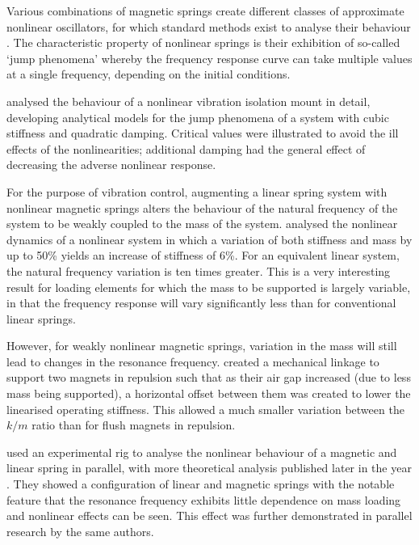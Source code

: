 Various combinations of magnetic springs create different classes of approximate nonlinear oscillators, for which standard methods exist to analyse their behaviour .
The characteristic property of nonlinear springs is their exhibition of so-called `jump phenomena' whereby the frequency response curve can take multiple values at a single frequency, depending on the initial conditions.

\textcite{jazar2006} analysed the behaviour of a nonlinear vibration isolation mount in detail, developing analytical models for the jump phenomena of a system with cubic stiffness and quadratic damping.
Critical values were illustrated to avoid the ill effects of the nonlinearities; additional damping had the general effect of decreasing the adverse nonlinear response.

For the purpose of vibration control, augmenting a linear spring system with nonlinear magnetic springs alters the behaviour of the natural frequency of the system to be weakly coupled to the mass of the system.
\textcite{dangola2006} analysed the nonlinear dynamics of a nonlinear system in which a variation of both stiffness and mass by up to 50\% yields an increase of stiffness of 6\%.
For an equivalent linear system, the natural frequency variation is ten times greater.
This is a very interesting result for loading elements for which the mass to be supported is largely variable, in that the frequency response will vary significantly less than for conventional linear springs.

However, for weakly nonlinear magnetic springs, variation in the mass will still lead to changes in the resonance frequency.
\textcite{todaka2001} created a mechanical linkage to support two magnets in repulsion such that as their air gap increased (due to less mass being supported), a horizontal offset between them was created to lower the linearised operating stiffness.
This allowed a much smaller variation between the $k/m$ ratio than for flush magnets in repulsion.

\textcite{bonisoli2007-mssp} used an experimental rig to analyse the nonlinear behaviour of a magnetic and linear spring in parallel, with more theoretical analysis published later in the year \cite{bonisoli2007-mrc}.
They showed a configuration of linear and magnetic springs with the notable feature that the resonance frequency exhibits little dependence on mass loading and nonlinear effects can be seen.
This effect was further demonstrated in parallel research by the same authors.

